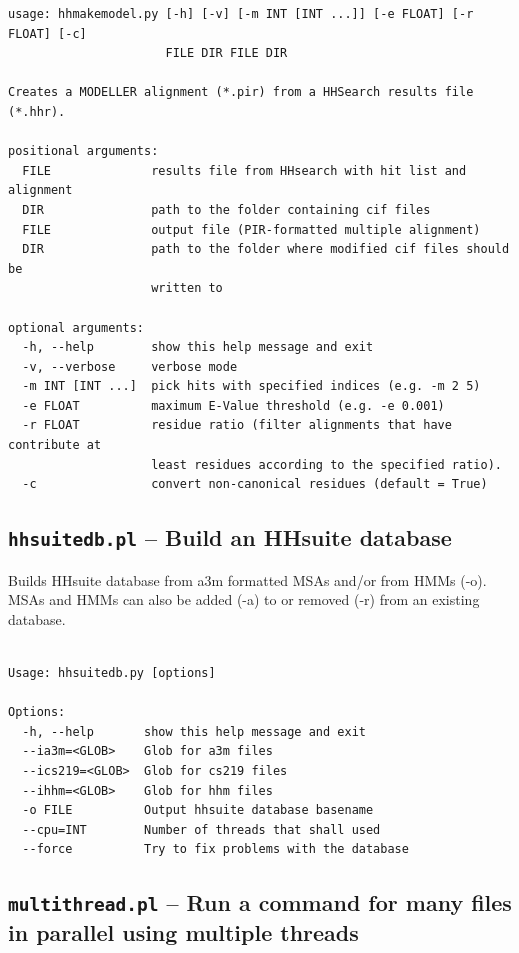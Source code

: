 \documentclass[11pt,a4paper]{article}
\begin{document}
\small
\begin{verbatim}
usage: hhmakemodel.py [-h] [-v] [-m INT [INT ...]] [-e FLOAT] [-r FLOAT] [-c]
                      FILE DIR FILE DIR

Creates a MODELLER alignment (*.pir) from a HHSearch results file (*.hhr).

positional arguments:
  FILE              results file from HHsearch with hit list and alignment
  DIR               path to the folder containing cif files
  FILE              output file (PIR-formatted multiple alignment)
  DIR               path to the folder where modified cif files should be
                    written to

optional arguments:
  -h, --help        show this help message and exit
  -v, --verbose     verbose mode
  -m INT [INT ...]  pick hits with specified indices (e.g. -m 2 5)
  -e FLOAT          maximum E-Value threshold (e.g. -e 0.001)
  -r FLOAT          residue ratio (filter alignments that have contribute at
                    least residues according to the specified ratio).
  -c                convert non-canonical residues (default = True)
\end{verbatim} 
\normalsize

\subsection{{\tt hhsuitedb.pl} -- Build an HHsuite database }

Builds HHsuite database from a3m formatted MSAs and/or from HMMs (-o).
MSAs and HMMs can also be added (-a) to or removed (-r) from an existing database. 

\small 
\begin{verbatim}

Usage: hhsuitedb.py [options]

Options:
  -h, --help       show this help message and exit
  --ia3m=<GLOB>    Glob for a3m files
  --ics219=<GLOB>  Glob for cs219 files
  --ihhm=<GLOB>    Glob for hhm files
  -o FILE          Output hhsuite database basename
  --cpu=INT        Number of threads that shall used
  --force          Try to fix problems with the database

\end{verbatim} 
\normalsize

\subsection{{\tt multithread.pl} -- Run a command for many files in parallel using multiple threads}
\end{document}
